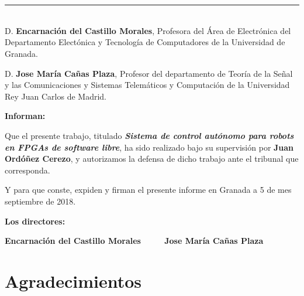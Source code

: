 \chapter*{}
\thispagestyle{empty}

\noindent\rule[-1ex]{\textwidth}{2pt}\\[4.5ex]

D. \textbf{Encarnación del Castillo Morales}, Profesora del Área de Electrónica del Departamento Electónica y Tecnología de Computadores de la Universidad de Granada.

\vspace{0.5cm}

D. \textbf{Jose María Cañas Plaza}, Profesor del departamento de Teoría de la Señal y las Comunicaciones y Sistemas Telemáticos y Computación de la Universidad Rey Juan Carlos de Madrid.


\vspace{0.5cm}

\textbf{Informan:}

\vspace{0.5cm}

Que el presente trabajo, titulado \textit{\textbf{Sistema de control autónomo para robots en FPGAs de software libre}},
ha sido realizado bajo su supervisión por \textbf{Juan Ordóñez Cerezo}, y autorizamos la defensa de dicho trabajo ante el tribunal
que corresponda.

\vspace{0.5cm}

Y para que conste, expiden y firman el presente informe en Granada a 5 de mes septiembre de 2018.

\vspace{1cm}

\textbf{Los directores:}

\vspace{5cm}

\noindent \textbf{Encarnación del Castillo Morales\ \ \ \ \ Jose María Cañas Plaza}

\chapter*{Agradecimientos}
\thispagestyle{empty}

       \vspace{1cm}

